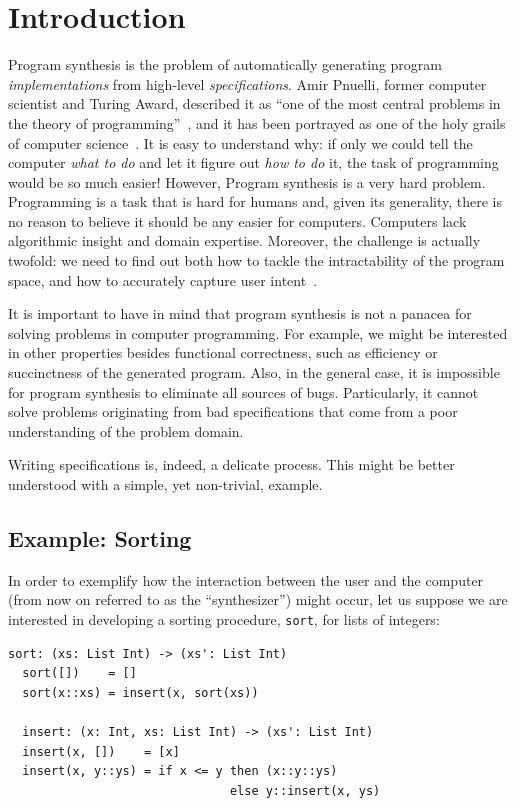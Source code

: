 \chapter{Introduction}
\label{chapter:introduction}

Program synthesis is the problem of automatically generating program
\textit{implementations} from high-level \textit{specifications}.
Amir Pnuelli, former computer scientist and Turing Award, described it as ``one
of the most central problems in the theory of
programming''~\cite{Pnueli:1989:ARM}, and it has been portrayed as one of the
holy grails of computer science~\cite{Solar-Lezama:2008,Gulwani2017}.
It is easy to understand why: if only we could tell the computer \textit{what to
do} and let it figure out \textit{how to do} it, the task of programming would
be so much easier!
However, Program synthesis is a very hard problem.
Programming is a task that is hard for humans and, given its generality,
there is no reason to believe it should be any easier for computers.
Computers lack algorithmic insight and domain expertise.
Moreover, the challenge is actually twofold: we need to find out both how to
tackle the intractability of the program space, and how to accurately capture
user intent~\cite{Gulwani2017}.

It is important to have in mind that program synthesis is not a panacea for
solving problems in computer programming.
For example, we might be interested in other properties besides functional
correctness, such as efficiency or succinctness of the generated program.
Also, in the general case, it is impossible for program synthesis to eliminate
all sources of bugs.
Particularly, it cannot solve problems originating from bad specifications
that come from a poor understanding of the problem domain.

Writing specifications is, indeed, a delicate process.
This might be better understood with a simple, yet non-trivial, example.

\section{Example: Sorting}
\label{sec:sorting-example}

In order to exemplify how the interaction between the user and the computer
(from now on referred to as the ``synthesizer'') might occur, let us suppose we
are interested in developing a sorting procedure, \lstinline{sort}, for lists of
integers:

\begin{lstlisting}[xleftmargin=.2\textwidth]
  sort: (xs: List Int) -> (xs': List Int)
  sort([])    = []
  sort(x::xs) = insert(x, sort(xs))

  insert: (x: Int, xs: List Int) -> (xs': List Int)
  insert(x, [])    = [x]
  insert(x, y::ys) = if x <= y then (x::y::ys)
                               else y::insert(x, ys)
\end{lstlisting}


